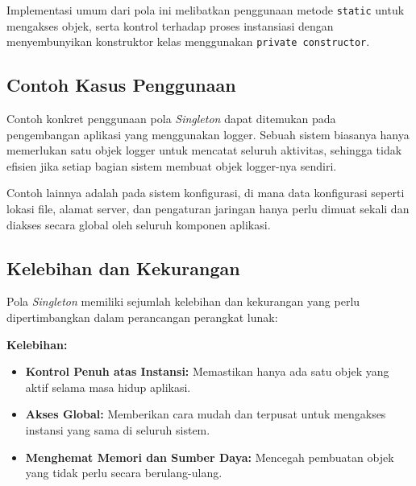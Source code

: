 Implementasi umum dari pola ini melibatkan penggunaan metode \texttt{static} untuk mengakses objek, serta kontrol terhadap proses instansiasi dengan menyembunyikan konstruktor kelas menggunakan \texttt{private constructor}.

\subsection{Contoh Kasus Penggunaan}
Contoh konkret penggunaan pola \textit{Singleton} dapat ditemukan pada pengembangan aplikasi yang menggunakan logger. Sebuah sistem biasanya hanya memerlukan satu objek logger untuk mencatat seluruh aktivitas, sehingga tidak efisien jika setiap bagian sistem membuat objek logger-nya sendiri.

Contoh lainnya adalah pada sistem konfigurasi, di mana data konfigurasi seperti lokasi file, alamat server, dan pengaturan jaringan hanya perlu dimuat sekali dan diakses secara global oleh seluruh komponen aplikasi.

\subsection{Kelebihan dan Kekurangan}
Pola \textit{Singleton} memiliki sejumlah kelebihan dan kekurangan yang perlu dipertimbangkan dalam perancangan perangkat lunak:

\textbf{Kelebihan:}
\begin{itemize}
	\item \textbf{Kontrol Penuh atas Instansi:} Memastikan hanya ada satu objek yang aktif selama masa hidup aplikasi.
	\item \textbf{Akses Global:} Memberikan cara mudah dan terpusat untuk mengakses instansi yang sama di seluruh sistem.
	\item \textbf{Menghemat Memori dan Sumber Daya:} Mencegah pembuatan objek yang tidak perlu secara berulang-ulang.
\end{itemize}

